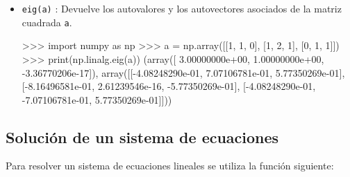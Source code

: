\documentclass[
  spanish,
  a4paper,
]{scrreport}
\newenvironment{Shaded}{\begin{snugshade}}{\end{snugshade}}
\newcommand{\BuiltInTok}[1]{\textcolor[rgb]{0.00,0.23,0.31}{#1}}
\newcommand{\DecValTok}[1]{\textcolor[rgb]{0.68,0.00,0.00}{#1}}
\newcommand{\FloatTok}[1]{\textcolor[rgb]{0.68,0.00,0.00}{#1}}
\newcommand{\ImportTok}[1]{\textcolor[rgb]{0.00,0.46,0.62}{#1}}
\newcommand{\NormalTok}[1]{\textcolor[rgb]{0.00,0.23,0.31}{#1}}
\newcommand{\OperatorTok}[1]{\textcolor[rgb]{0.37,0.37,0.37}{#1}}
\begin{document}
\begin{itemize}
\item
  \texttt{eig(a)} : Devuelve los autovalores y los autovectores
  asociados de la matriz cuadrada \texttt{a}.

\begin{Shaded}
\begin{Highlighting}[]
\OperatorTok{\textgreater{}\textgreater{}\textgreater{}} \ImportTok{import}\NormalTok{ numpy }\ImportTok{as}\NormalTok{ np}
\OperatorTok{\textgreater{}\textgreater{}\textgreater{}}\NormalTok{ a }\OperatorTok{=}\NormalTok{ np.array([[}\DecValTok{1}\NormalTok{, }\DecValTok{1}\NormalTok{, }\DecValTok{0}\NormalTok{], [}\DecValTok{1}\NormalTok{, }\DecValTok{2}\NormalTok{, }\DecValTok{1}\NormalTok{], [}\DecValTok{0}\NormalTok{, }\DecValTok{1}\NormalTok{, }\DecValTok{1}\NormalTok{]])}
\OperatorTok{\textgreater{}\textgreater{}\textgreater{}} \BuiltInTok{print}\NormalTok{(np.linalg.eig(a))}
\NormalTok{(array([ }\FloatTok{3.00000000e+00}\NormalTok{,  }\FloatTok{1.00000000e+00}\NormalTok{, }\OperatorTok{{-}}\FloatTok{3.36770206e{-}17}\NormalTok{]), array([[}\OperatorTok{{-}}\FloatTok{4.08248290e{-}01}\NormalTok{,  }\FloatTok{7.07106781e{-}01}\NormalTok{,  }\FloatTok{5.77350269e{-}01}\NormalTok{],}
\NormalTok{      [}\OperatorTok{{-}}\FloatTok{8.16496581e{-}01}\NormalTok{,  }\FloatTok{2.61239546e{-}16}\NormalTok{, }\OperatorTok{{-}}\FloatTok{5.77350269e{-}01}\NormalTok{],}
\NormalTok{      [}\OperatorTok{{-}}\FloatTok{4.08248290e{-}01}\NormalTok{, }\OperatorTok{{-}}\FloatTok{7.07106781e{-}01}\NormalTok{,  }\FloatTok{5.77350269e{-}01}\NormalTok{]]))}
\end{Highlighting}
\end{Shaded}
\end{itemize}

\subsection{Solución de un sistema de
ecuaciones}\label{soluciuxf3n-de-un-sistema-de-ecuaciones}

Para resolver un sistema de ecuaciones lineales se utiliza la función
siguiente:
\end{document}

